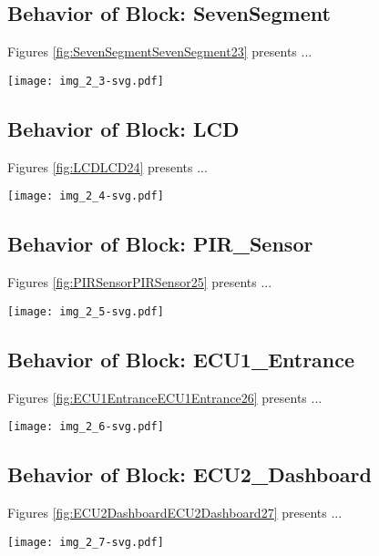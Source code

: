 \subsection{Behavior of Block: SevenSegment}
Figures \ref{fig:SevenSegmentSevenSegment23} presents ...
\begin{figure*}[htb]
\centering
\texttt{[image: img\_2\_3-svg.pdf]}
\caption{Diagram "Behavior of Block: SevenSegment"}
\label{fig:SevenSegmentSevenSegment23}
\end{figure*}

\subsection{Behavior of Block: LCD}
Figures \ref{fig:LCDLCD24} presents ...
\begin{figure*}[htb]
\centering
\texttt{[image: img\_2\_4-svg.pdf]}
\caption{Diagram "Behavior of Block: LCD"}
\label{fig:LCDLCD24}
\end{figure*}

\subsection{Behavior of Block: PIR\_Sensor}
Figures \ref{fig:PIRSensorPIRSensor25} presents ...
\begin{figure*}[htb]
\centering
\texttt{[image: img\_2\_5-svg.pdf]}
\caption{Diagram "Behavior of Block: PIR\_Sensor"}
\label{fig:PIRSensorPIRSensor25}
\end{figure*}

\subsection{Behavior of Block: ECU1\_Entrance}
Figures \ref{fig:ECU1EntranceECU1Entrance26} presents ...
\begin{figure*}[htb]
\centering
\texttt{[image: img\_2\_6-svg.pdf]}
\caption{Diagram "Behavior of Block: ECU1\_Entrance"}
\label{fig:ECU1EntranceECU1Entrance26}
\end{figure*}

\subsection{Behavior of Block: ECU2\_Dashboard}
Figures \ref{fig:ECU2DashboardECU2Dashboard27} presents ...
\begin{figure*}[htb]
\centering
\texttt{[image: img\_2\_7-svg.pdf]}
\caption{Diagram "Behavior of Block: ECU2\_Dashboard"}
\label{fig:ECU2DashboardECU2Dashboard27}
\end{figure*}

